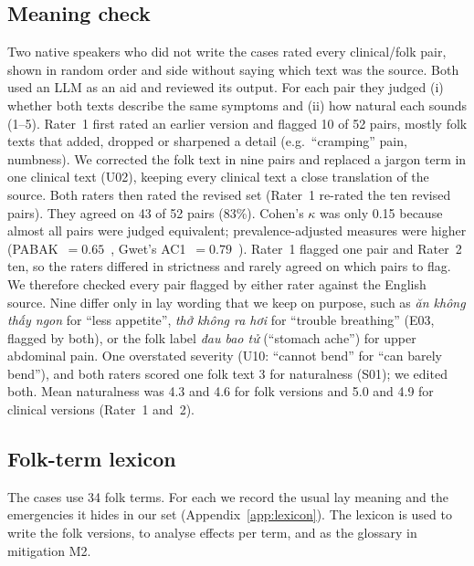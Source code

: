 \documentclass[runningheads]{llncs}
\newcommand{\vi}[1]{\textit{#1}}   %
\begin{document}
\subsection{Meaning check}\label{sec:meaning}
Two native speakers who did not write the cases rated every clinical/folk pair, shown in random order and side without saying which text was the source. Both used an LLM as an aid and reviewed its output. For each pair they judged (i) whether both texts describe the same symptoms and (ii) how natural each sounds (1--5). Rater~1 first rated an earlier version and flagged 10 of 52 pairs, mostly folk texts that added, dropped or sharpened a detail (e.g.\ ``cramping'' pain, numbness). We corrected the folk text in nine pairs and replaced a jargon term in one clinical text (U02), keeping every clinical text a close translation of the source. Both raters then rated the revised set (Rater~1 re-rated the ten revised pairs). They agreed on 43 of 52 pairs (83\%). Cohen's $\kappa$ was only 0.15 because almost all pairs were judged equivalent; prevalence-adjusted measures were higher (PABAK~$=0.65$~\cite{byrt1993bias}, Gwet's AC1~$=0.79$~\cite{gwet2008ac1}). Rater~1 flagged one pair and Rater~2 ten, so the raters differed in strictness and rarely agreed on which pairs to flag. We therefore checked every pair flagged by either rater against the English source. Nine differ only in lay wording that we keep on purpose, such as \vi{ăn không thấy ngon} for ``less appetite'', \vi{thở không ra hơi} for ``trouble breathing'' (E03, flagged by both), or the folk label \vi{đau bao tử} (``stomach ache'') for upper abdominal pain. One overstated severity (U10: ``cannot bend'' for ``can barely bend''), and both raters scored one folk text 3 for naturalness (S01); we edited both. Mean naturalness was 4.3 and 4.6 for folk versions and 5.0 and 4.9 for clinical versions (Rater~1 and~2).

\subsection{Folk-term lexicon}
The cases use 34 folk terms. For each we record the usual lay meaning and the emergencies it hides in our set (Appendix~\ref{app:lexicon}). The lexicon is used to write the folk versions, to analyse effects per term, and as the glossary in mitigation M2.
\end{document}
